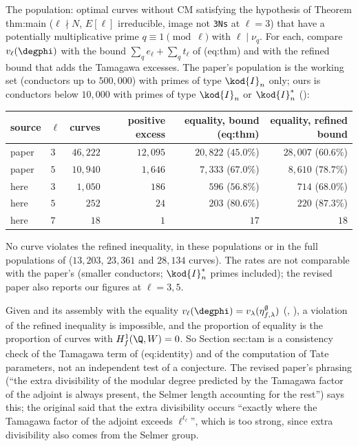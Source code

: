 \begin{example}\label{ex:blochkato:sec-tam}
The population: optimal curves without CM satisfying the hypothesis of Theorem thm:main ($\ell\nmid N$, $E[\ell]$ irreducible, image not \texttt{3Ns} at $\ell=3$) that have a
potentially multiplicative prime $q\equiv1\pmod\ell$ with $\ell\mid\nu_q$. For each, compare $v_\ell(\degphi)$ with the bound $\sum_qe_\ell+\sum_qt_\ell$ of (eq:thm) and with the
refined bound that adds the Tamagawa excesses. The paper's population is the working set (conductors up to $500{,}000$) with primes of type $\kod{I}_n$ only; ours is
conductors below $10{,}000$ with primes of type $\kod{I}_n$ or $\kod{I}_n^*$ ():
\begin{center}\small\setlength{\tabcolsep}{4pt}
\begin{tabular}{llrrrr}
\toprule
source & $\ell$ & curves & positive excess & equality, bound (eq:thm) & equality, refined bound\\
\midrule
paper & $3$ & $46{,}222$ & $12{,}095$ & $20{,}822$ ($45.0\%$) & $28{,}007$ ($60.6\%$)\\
paper & $5$ & $10{,}940$ & $1{,}646$ & $7{,}333$ ($67.0\%$) & $8{,}610$ ($78.7\%$)\\
here & $3$ & $1{,}050$ & $186$ & $596$ ($56.8\%$) & $714$ ($68.0\%$)\\
here & $5$ & $252$ & $24$ & $203$ ($80.6\%$) & $220$ ($87.3\%$)\\
here & $7$ & $18$ & $1$ & $17$ & $18$\\
\bottomrule
\end{tabular}
\end{center}
No curve violates the refined inequality, in these populations or in the full populations of  ($13{,}203$, $23{,}361$ and $28{,}134$ curves). The
rates are not comparable with the paper's (smaller conductors; $\kod{I}_n^*$ primes included); the revised paper also reports our figures at $\ell=3,5$.
\end{example}

\begin{remark}\label{rem:blochkato:what-sec-tam-tests}
Given  and its assembly with the equality $v_\ell(\degphi)=v_\lambda(\eta^\emptyset_{f,\lambda})$ (, ), a violation of the
refined inequality is impossible, and the proportion of equality is the proportion of curves with $H^1_f(\Q,W)=0$. So Section sec:tam is a consistency check of the
Tamagawa term of (eq:identity) and of the computation of Tate parameters, not an independent test of a conjecture. The revised paper's phrasing (``the extra
divisibility of the modular degree predicted by the Tamagawa factor of the adjoint is always present, the Selmer length accounting for the rest'') says this; the
original said that the extra divisibility occurs ``exactly where the Tamagawa factor of the adjoint exceeds $\ell^{t_\ell}$'', which is too strong, since extra
divisibility also comes from the Selmer group.
\end{remark}

